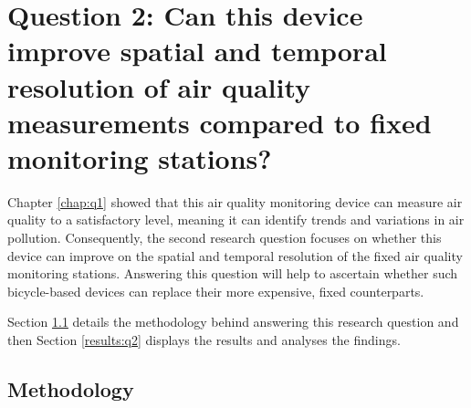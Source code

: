 \documentclass[11pt,twosided,a4paper]{report}
\begin{document}
%
%


\chapter[Improving spatial \& temporal resolution]{Question 2: Can this device improve spatial and temporal resolution of air quality measurements compared to fixed monitoring stations?}  \label{chap:q2}

Chapter \ref{chap:q1} showed that this air quality monitoring device can measure air quality to a satisfactory level, meaning it can identify trends and variations in air pollution. Consequently, the second research question focuses on whether this device can improve on the spatial and temporal resolution of the fixed air quality monitoring stations. Answering this question will help to ascertain whether such bicycle-based devices can replace their more expensive, fixed counterparts.

Section \ref{meth:q2} details the methodology behind answering this research question and then Section \ref{results:q2} displays the results and analyses the findings.

\section{Methodology} \label{meth:q2}
\end{document}
